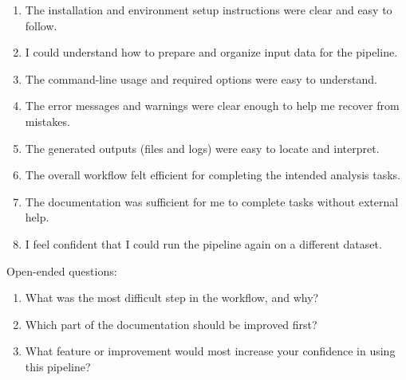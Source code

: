 \documentclass[12pt, titlepage]{article}
\begin{document}
\begin{enumerate}
    \item The installation and environment setup instructions were clear and easy to follow.
    \item I could understand how to prepare and organize input data for the pipeline.
    \item The command-line usage and required options were easy to understand.
    \item The error messages and warnings were clear enough to help me recover from mistakes.
    \item The generated outputs (files and logs) were easy to locate and interpret.
    \item The overall workflow felt efficient for completing the intended analysis tasks.
    \item The documentation was sufficient for me to complete tasks without external help.
    \item I feel confident that I could run the pipeline again on a different dataset.
\end{enumerate}

Open-ended questions:
\begin{enumerate}
    \item What was the most difficult step in the workflow, and why?
    \item Which part of the documentation should be improved first?
    \item What feature or improvement would most increase your confidence in using this pipeline?
\end{enumerate}
\end{document}
